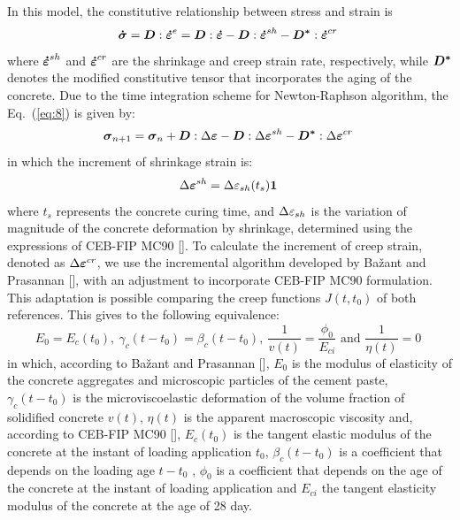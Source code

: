 \documentclass[a4paper,fleqn]{cas-sc}
\begin{document}
In this model, the constitutive relationship between stress and strain is 
\begin{equation} \label{eq:8}
	\boldsymbol{\dot{\sigma}} = \boldsymbol{D} : \boldsymbol{\dot{\varepsilon}}^{e} = \boldsymbol{D} : \boldsymbol{\dot{\varepsilon}} - \boldsymbol{D} : \boldsymbol{\dot{\varepsilon}}^{sh} - \boldsymbol{D^{*}} : \boldsymbol{\dot{\varepsilon}}^{cr} \;
\end{equation}
where $\boldsymbol{\dot{\varepsilon}}^{sh}$  and $\boldsymbol{\dot{\varepsilon}}^{cr}$ are the shrinkage and creep strain rate, respectively, while $\boldsymbol{D^{*}}$ denotes the modified constitutive tensor that incorporates the aging of the concrete. Due to the time integration scheme for Newton-Raphson algorithm, the Eq.~(\ref{eq:8}) is given by:
\begin{equation} \label{eq:9}
	\boldsymbol{\sigma}_{n+1} = \boldsymbol{\sigma}_{n}+\boldsymbol{D} : \Delta \boldsymbol{\varepsilon} - \boldsymbol{D} : \Delta \boldsymbol{\varepsilon}^{sh} - \boldsymbol{D^{*}} : \Delta \boldsymbol{\varepsilon}^{cr} \;
\end{equation}
in which the increment of shrinkage strain is:
\begin{equation} \label{eq:10}
	\Delta \boldsymbol{\varepsilon}^{sh} =  \Delta \varepsilon_{sh}(t_{s}) \boldsymbol{1} \;
\end{equation}
where $t_{s}$ represents the concrete curing time, and $\Delta \varepsilon_{sh}$ is the variation of magnitude of the concrete deformation by shrinkage, determined using the expressions of CEB-FIP MC90 []. To calculate the increment of creep strain, denoted as $\Delta \boldsymbol{\varepsilon}^{cr}$, we use the incremental algorithm developed by Bažant and Prasannan [], with an adjustment to incorporate CEB-FIP MC90 formulation. This adaptation is possible comparing the creep functions $J(t,t_0)$ of both references. This gives to the following equivalence:
\begin{equation} \label{eq:11}
	E_0 = E_c(t_0),~ \gamma_c(t-t_0)=\beta_c(t-t_0),~ \frac{1}{v(t)} = \frac{\phi_0}{E_{ci}} \text{  and  } \frac{1}{\eta(t)}=0 \;
\end{equation}
in which, according to Bažant and Prasannan [], $E_0$  is the modulus of elasticity of the concrete aggregates and microscopic particles of the cement paste, $\gamma_c(t-t_0)$ is the microviscoelastic deformation of the volume fraction of solidified concrete $v(t)$, $\eta(t)$ is the apparent macroscopic viscosity and, according to CEB-FIP MC90 [], $E_c(t_0)$ is the tangent elastic modulus of the concrete at the instant of loading application $t_0$, $\beta_c(t-t_0)$  is a coefficient that depends on the loading age $t-t_0$ , $\phi_0$ is a coefficient that depends on the age of the concrete at the instant of loading application and $E_{ci}$  the tangent elasticity modulus of the concrete at the age of 28 day.
\end{document}
